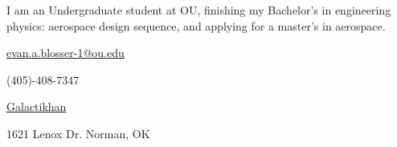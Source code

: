 \documentclass[11pt]{spidercv}
\begin{document}
    \PrintableMode

    \begin{TopBar}{\ColorTextSide}

        \SimpleSeparator{\ColorHighlight}

       
       
        I am an Undergraduate student at OU, finishing my Bachelor's in engineering physics: aerospace design sequence, and applying for a master's in aerospace.

        \begin{DoubleColumns}
            \begin{ItemList}{\ColorHighlight}
                \item [\Large\faAt] \href{mailto:evan.a.blosser-1@ou.edu}{evan.a.blosser-1@ou.edu}
                \item [\Large\faMobile] (405)-408-7347
            \end{ItemList}
            \nextcolumn
            \begin{ItemList}{\ColorHighlight}
                \item [\Large\faGithub] \href{https://github.com/romainpc}{Galactikhan}
                \item [\Large\faHome] {1621 Lenox Dr. Norman, OK}
            \end{ItemList}
            
        \end{DoubleColumns}

    \end{TopBar}
\end{document}
